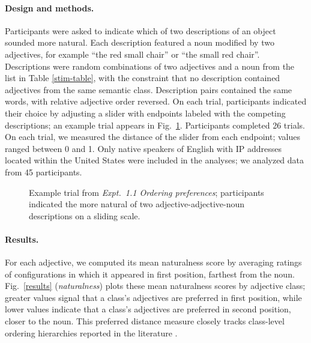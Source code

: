 \documentclass[12pt]{article}
\begin{document}
\paragraph{Design and methods.} Participants were asked to indicate which of two descriptions of an object sounded more natural. Each description featured a noun modified by two adjectives, for example ``the red small chair'' or ``the small red chair''. Descriptions were random combinations of two adjectives and a noun from the list in Table \ref{stim-table}, with the constraint that no description contained adjectives from the same semantic class. Description pairs contained the same words, with relative adjective order reversed. 
On each trial, participants indicated their choice by adjusting a slider with endpoints labeled with the competing descriptions; an example trial appears in Fig.\ \ref{order-trial}. Participants completed 26 trials. On each trial, we measured the distance of the slider from each endpoint; values ranged between 0 and 1. Only native speakers of English with IP addresses located within the United States were included in the analyses; we analyzed data from 45 participants. 

\begin{figure}[h]
	\centering
	\caption{Example trial from \emph{Expt.\ 1.1 Ordering preferences}; participants indicated the more natural of two adjective-adjective-noun descriptions on a sliding scale.}\label{order-trial}
\end{figure}

\paragraph{Results.} For each adjective, we computed its mean naturalness score by averaging ratings of configurations in which it appeared in first position, farthest from the noun. Fig.\ \ref{results} (\emph{naturalness}) plots these mean naturalness scores by adjective class; greater values signal that a class's adjectives are preferred in first position, while lower values indicate that a class's adjectives are preferred in second position, closer to the noun. This preferred distance measure closely tracks class-level ordering hierarchies reported in the literature \citep{dixon1982,Sproat1991}.
\end{document}

